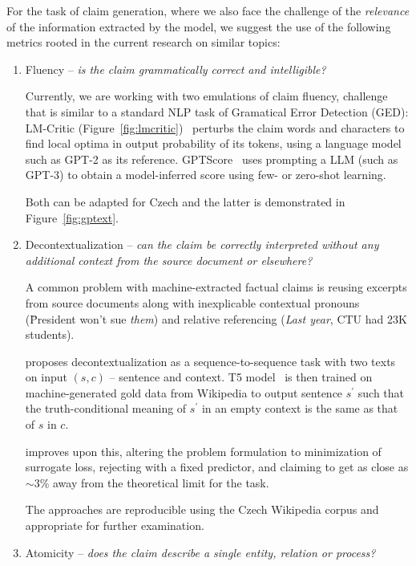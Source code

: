 For the task of claim generation, where we also face the challenge of the \textit{relevance} of the information extracted by the model, we suggest the use of the following metrics rooted in the current research on similar topics:

\begin{enumerate}
    \item {\techbf Fluency} -- \textit{is the claim grammatically correct and intelligible?}
    
    Currently, we are working with two emulations of claim fluency, challenge that is similar to a standard NLP task of Gramatical Error Detection (GED): \textsf{LM-Critic} (Figure~\ref{fig:lmcritic})~\cite{yasunaga-etal-2021-lm} perturbs the claim words and characters to find local optima in output probability of its tokens, using a language model such as GPT-2 as its reference. \textsf{GPTScore}~\cite{fu2023gptscore} uses prompting a LLM (such as GPT-3) to obtain a model-inferred score using few- or zero-shot learning.
    
    Both can be adapted for Czech and the latter is demonstrated in Figure~\ref{fig:gptext}.
    \item {\techbf Decontextualization} -- \textit{can the claim be correctly interpreted without any additional context from the source document or elsewhere?}
    
    A common problem with machine-extracted factual claims is reusing excerpts from source documents along with inexplicable contextual pronouns (\"{President won't sue \textit{them}}) and relative referencing (\"{\textit{Last year}, CTU had 23K students}).

\cite{choi-etal-2021-decontextualization} proposes decontextualization as a sequence-to-sequence task with two texts on input $(s,c)$ -- sentence and context.
    T5 model~\cite{t5-11b} is then trained on machine-generated gold data from Wikipedia to output sentence $s^\prime$ such that the truth-conditional meaning of $s^\prime$ in an empty context is the same as that of $s$ in $c$.

    \cite{mohri2023learning} improves upon this, altering the problem formulation to minimization of surrogate loss, rejecting with a fixed predictor, and claiming to get as close as $\sim3\%$ away from the theoretical limit for the task.

    The approaches are reproducible using the Czech Wikipedia corpus and appropriate for further examination.

    \item {\techbf Atomicity} --  \textit{does the claim describe a single entity, relation or process?}
    \label{atomicity}
    

\end{enumerate}
